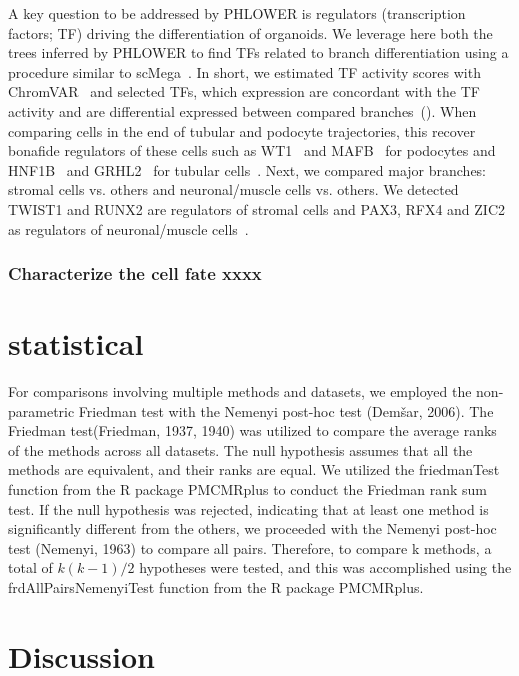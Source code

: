 A key question to be addressed by PHLOWER is regulators (transcription factors; TF) driving the differentiation of organoids. We leverage here both the trees inferred by PHLOWER to find TFs related to branch differentiation using a procedure similar to scMega~\citep{li2023scmega}. In short, we estimated TF activity scores with ChromVAR~\citep{schep2017chromvar} and selected TFs, which expression are concordant with the TF activity and are differential expressed between compared branches~(). When comparing cells in the end of tubular and podocyte trajectories, this recover bonafide regulators of these cells such as WT1~\citep{kann2015genome} and MAFB~\citep{schreibing2022mapping} for podocytes and HNF1B~\citep{kompatscher2017loss} and GRHL2~\cite{aue2015grainyhead} for tubular cells~. Next, we compared major branches: stromal cells vs. others and neuronal/muscle cells vs. others. We detected TWIST1 and RUNX2 are regulators of stromal cells and PAX3, RFX4 and ZIC2 as regulators of neuronal/muscle cells~.


\subsubsection{Characterize the cell fate xxxx}

\section{statistical}
\label{PHLOWER_bench:statistical}

For comparisons involving multiple methods and datasets, we employed the non-parametric Friedman test with the Nemenyi post-hoc test (Demšar, 2006). The Friedman test(Friedman, 1937, 1940) was utilized to compare the average ranks of the methods across all datasets. The null hypothesis assumes that all the methods are equivalent, and their ranks are equal. We utilized the friedmanTest function from the R package PMCMRplus to conduct the Friedman rank sum test. If the null hypothesis was rejected, indicating that at least one method is significantly different from the others, we proceeded with the Nemenyi post-hoc test (Nemenyi, 1963) to compare all pairs. Therefore, to compare k methods, a total of $k(k-1)/2$ hypotheses were tested, and this was accomplished using the frdAllPairsNemenyiTest function from the R package PMCMRplus.



\section{Discussion}
\label{PHLOWER_bench:discussion}

